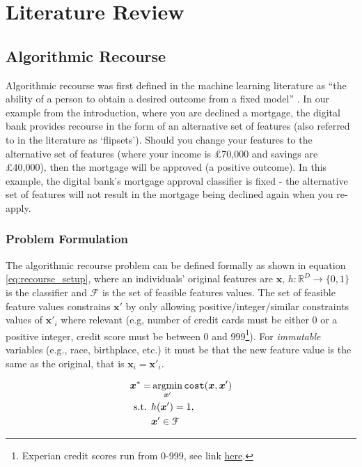 \chapter{Literature Review} \label{chapter:lit_review}

\section{Algorithmic Recourse}

Algorithmic recourse was first defined in the machine learning literature as ``the ability of a person to obtain a desired outcome from a fixed model'' \citep{ustunActionableRecourseLinear2019}. In our example from the introduction, where you are declined a mortgage, the digital bank provides recourse in the form of an alternative set of features (also referred to in the literature as `flipsets'). Should you change your features to the alternative set of features (where your income is £70,000 and savings are £40,000), then the mortgage will be approved (a positive outcome). In this example, the digital bank's mortgage approval classifier is fixed - the alternative set of features will not result in the mortgage being declined again when you re-apply.


\subsection{Problem Formulation}
The algorithmic recourse problem can be defined formally as shown in equation \ref{eq:recourse_setup}, where an individuals' original features are $\boldsymbol{x}$, $h: \mathbb{R}^D \to \{0,1\}$ is the classifier and $\mathcal{F}$ is the set of feasible features values. The set of feasible feature values constrains $\boldsymbol{x}'$ by only allowing positive/integer/similar constraints values of $\boldsymbol{x}'_i$ where relevant (e.g, number of credit cards must be either 0 or a positive integer, credit score must be between 0 and 999\footnote{Experian credit scores run from 0-999, see link \href{https://www.experian.co.uk/consumer/experian-credit-score.html}{here}.}). For \textit{immutable} variables (e.g., race, birthplace, etc.) it must be that the new feature value is the same as the original, that is $\boldsymbol{x}_i=\boldsymbol{x}'_i$.

\begin{align} \label{eq:recourse_setup}
	\boldsymbol{x}^* = & \operatorname*{argmin}_{\boldsymbol{x}'}  \operatorname*{\texttt{cost}}(\boldsymbol{x}, \boldsymbol{x}') \\ \nonumber
	\text{s.t. } & h(\boldsymbol{x}') = 1, \\ \nonumber
	& \boldsymbol{x}' \in \mathcal{F}
\end{align}

